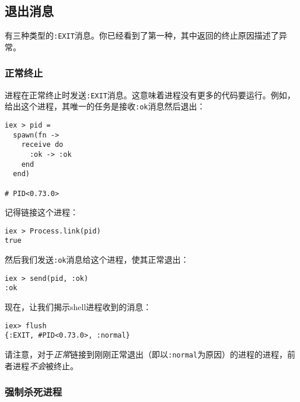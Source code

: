 \subsection{退出消息}

有三种类型的\texttt{:EXIT}消息。你已经看到了第一种，其中返回的终止原因描述了异常。

\subsubsection{正常终止}

进程在正常终止时发送\texttt{:EXIT}消息。这意味着进程没有更多的代码要运行。例如，给出这个进程，其唯一的任务是接收\texttt{:ok}消息然后退出：

\begin{code}{}
\begin{verbatim}
iex > pid =
  spawn(fn ->
    receive do
      :ok -> :ok
    end
  end)

# PID<0.73.0>
\end{verbatim}
\end{code}

记得链接这个进程：

\begin{code}{}
\begin{verbatim}
iex > Process.link(pid)
true
\end{verbatim}
\end{code}

然后我们发送\texttt{:ok}消息给这个进程，使其正常退出：

\begin{code}{}
\begin{verbatim}
iex > send(pid, :ok)
:ok
\end{verbatim}
\end{code}

现在，让我们揭示shell进程收到的消息：

\begin{code}{}
\begin{verbatim}
iex> flush
{:EXIT, #PID<0.73.0>, :normal}
\end{verbatim}
\end{code}

请注意，对于\emph{正常}链接到刚刚正常退出（即以\texttt{:normal}为原因）的进程的进程，前者进程\emph{不会}被终止。

\subsubsection{强制杀死进程}

